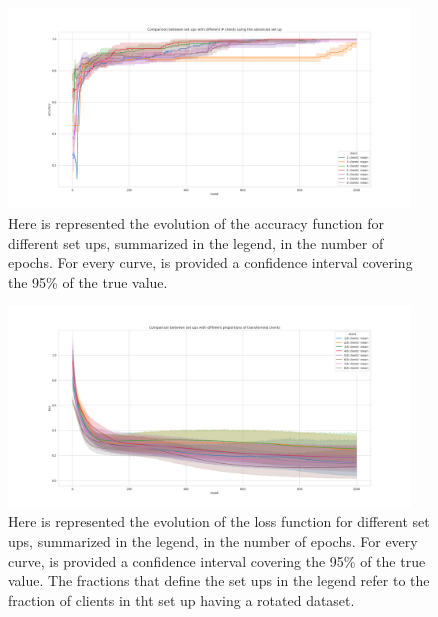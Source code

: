 \documentclass{article} %
\begin{document}
\begin{figure}[!hb]
    \centering
        \includegraphics[width=0.95\textwidth, keepaspectratio]{images/accuracy_red_adv.png}
    \caption{Here is represented the evolution of the accuracy function for different set ups, 
        summarized in the legend, in the number of epochs. For every curve, is provided a confidence 
        interval covering the 95\% of the true value.}
    \label{fig7}
\end{figure}
\newpage
\begin{figure}[!ht]
    \centering
        \includegraphics[width=0.95\textwidth, keepaspectratio]{images/loss_red_TL2.png}
    \caption{Here is represented the evolution of the loss function for different set ups, 
    summarized in the legend, in the number of epochs. For every curve, is provided a confidence 
    interval covering the 95\% of the true value. The fractions that define the set ups in the 
    legend refer to the fraction of clients in tht set up having a rotated dataset.}
    \label{fig8}
\end{figure}
\end{document}
